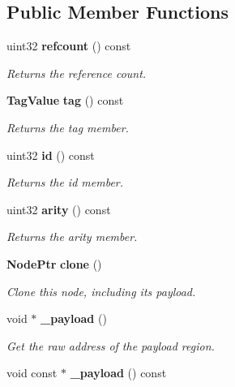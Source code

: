 \subsection*{Public Member Functions}
\begin{CompactItemize}
\item 
uint32 {\bf refcount} () const \label{structsprite_1_1Node_a0}

\begin{CompactList}\small\item\em Returns the reference count. \item\end{CompactList}\item 
{\bf Tag\-Value} {\bf tag} () const \label{structsprite_1_1Node_a1}

\begin{CompactList}\small\item\em Returns the tag member. \item\end{CompactList}\item 
uint32 {\bf id} () const \label{structsprite_1_1Node_a2}

\begin{CompactList}\small\item\em Returns the id member. \item\end{CompactList}\item 
uint32 {\bf arity} () const \label{structsprite_1_1Node_a3}

\begin{CompactList}\small\item\em Returns the arity member. \item\end{CompactList}\item 
{\bf Node\-Ptr} {\bf clone} ()
\begin{CompactList}\small\item\em Clone this node, including its payload. \item\end{CompactList}\item 
void $\ast$ {\bf \_\-payload} ()\label{structsprite_1_1Node_a5}

\begin{CompactList}\small\item\em Get the raw address of the payload region. \item\end{CompactList}\item 
void const $\ast$ {\bf \_\-payload} () const \label{structsprite_1_1Node_a6}


\end{CompactItemize}

